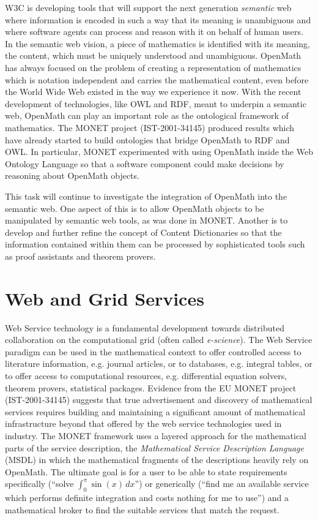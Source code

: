 \documentclass[draft]{artikel3}
\begin{document}
W3C is developing tools that will support the next generation
\emph{semantic} web where information is encoded in such a way that
its meaning is unambiguous and where software agents can process and
reason with it on behalf of human users.  In the semantic web vision,
a piece of mathematics is identified with its meaning, the content,
which must be uniquely understood and unambiguous.  OpenMath has
always focused on the problem of creating a representation of
mathematics which is notation independent and carries the mathematical
content, even before the World Wide Web existed in the way we
experience it now. With the recent development of technologies, like
OWL and RDF, meant to underpin a semantic web, OpenMath can play an
important role as the ontological framework of mathematics. The MONET
project (IST-2001-34145) produced results which have already started
to build ontologies that bridge OpenMath to RDF and OWL.  In
particular, MONET experimented with using OpenMath inside the Web
Ontology Language so that a software component could make decisions by
reasoning about OpenMath objects.

This task will continue to investigate the integration of OpenMath
into the semantic web.  One aspect of this is to allow OpenMath
objects to be manipulated by semantic web tools, as was done in MONET.
Another is to develop and further refine the concept of Content
Dictionaries so that the information contained within them can be
processed by sophisticated tools such as proof assistants and theorem
provers.

\section{Web and Grid Services}



Web Service technology is a fundamental development towards
distributed collaboration on the computational grid (often called
\emph{e-science}).  The Web Service paradigm can be used in the
mathematical context to offer controlled access to literature
information, e.g. journal articles, or to databases, e.g.  integral
tables, or to offer access to computational resources, e.g.
differential equation solvers, theorem provers, statistical packages.
Evidence from the EU MONET project (IST-2001-34145) suggests that true
advertisement and discovery of mathematical services requires building
and maintaining a significant amount of mathematical infrastructure
beyond that offered by the web service technologies used in industry.
The MONET framework uses a layered approach for the mathematical parts
of the service description, the \emph{Mathematical Service Description
  Language} (MSDL) in which the mathematical fragments of the
descriptions heavily rely on OpenMath.  The ultimate goal is for a
user to be able to state requirements specifically (``solve
$\int_0^\pi{}\sin(x)\,dx$'') or generically (``find me an available
service which performs definite integration and costs nothing for me
to use'') and a mathematical broker to find the suitable services that
match the request.
\end{document}
